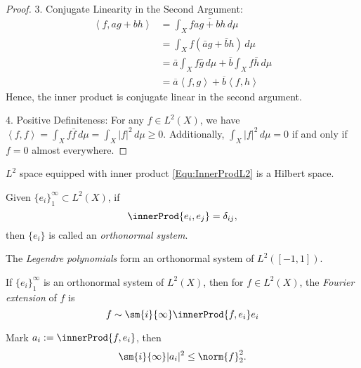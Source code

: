 \begin{proof}
3. Conjugate Linearity in the Second Argument:
   \begin{align*}
   \left<f, ag + bh\right> &= \int_{X}f\overline{ag + bh}\,
   d\mu \\
   &= \int_{X}f(\bar{a}g + \bar{b}h)\,d\mu \\
   &= \bar{a}\int_{X}f\bar{g}\,d\mu + \bar{b}\int_{X}f\bar{h}\,
   d\mu \\
   &= \overline{a}\left<f,g\right> + \overline{b}\left<f,h\right>
   \end{align*}
   Hence, the inner product is conjugate linear in the 
   second argument.

4. Positive Definiteness:
   For any $f \in L^2(X)$, we have $\left<f,f\right> = 
   \int_{X}f\bar{f}\,d\mu = \int_{X}|f|^2\,d\mu \geq 0$. 
   Additionally, $\int_{X}|f|^2\,d\mu = 0$ if and only if 
   $f = 0$ almost everywhere.
\end{proof}
\begin{thm}
    $L^{2}$ space equipped with inner product \eqref{Equ:InnerProdL2} 
    is a Hilbert space. 
\end{thm}
\begin{defn}
    \label{Defn:OrthonormalSet}
    Given $\{e_{i}\}_{1}^{\infty}\subset L^{2}(X)$, if 
    \begin{displaymath}
        \innerProd{e_i,e_{j}}=\delta_{ij},
    \end{displaymath}
    then $\{e_{i}\}$ is called an \textit{orthonormal system}.
\end{defn}
\begin{exm}
    The \textit{Legendre polynomials} form an orthonormal 
    system of $L^{2}([-1,1])$.
\end{exm}
\begin{defn}
    If $\{e_{i}\}_{1}^{\infty}$ is an orthonormal 
    system of $L^{2}(X)$, then for $f\in L^{2}(X)$, the 
    \textit{Fourier extension} of $f$ is 
    \begin{displaymath}
        f\sim\sm{i}{\infty}\innerProd{f,e_i}e_i
    \end{displaymath}
\end{defn}
\begin{thm}
    Mark $a_{i}:=\innerProd{f,e_i}$, then 
    \begin{displaymath}
        \sm{i}{\infty}|a_{i}|^{2}\le\norm{f}_{2}^{2}.
    \end{displaymath}
\end{thm}
